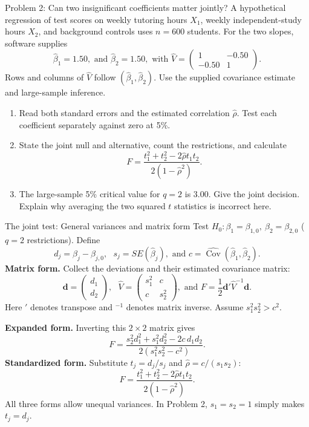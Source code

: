 \documentclass[notes,10pt, aspectratio=169]{beamer}
\newcommand{\Cov}{\operatorname{Cov}}
\begin{document}
\begin{frame}{Problem 2: Can two insignificant coefficients matter jointly?}
\small
A hypothetical regression of test scores on weekly tutoring hours $X_1$, weekly independent-study hours $X_2$, and background controls uses $n=600$ students. For the two slopes, software supplies
\[
\hat\beta_1=1.50,\text{ and }\hat\beta_2=1.50,\text{ with }
\widehat V=\begin{pmatrix}1&-0.50\\-0.50&1\end{pmatrix}.
\]
Rows and columns of $\widehat V$ follow $(\hat\beta_1,\hat\beta_2)$. Use the supplied covariance estimate and large-sample inference.
\begin{enumerate}
\item Read both standard errors and the estimated correlation $\hat\rho$. Test each coefficient separately against zero at 5\%.
\item State the joint null and alternative, count the restrictions, and calculate
\[
F=\frac{t_1^2+t_2^2-2\hat\rho t_1t_2}{2(1-\hat\rho^2)}.
\]
\item The large-sample 5\% critical value for $q=2$ is $3.00$. Give the joint decision. Explain why averaging the two squared $t$ statistics is incorrect here.
\end{enumerate}
\end{frame}

\begin{frame}{The joint test: General variances and matrix form}
\footnotesize
\setlength{\abovedisplayskip}{3pt}
\setlength{\belowdisplayskip}{3pt}
Test $H_0:\beta_1=\beta_{1,0},\ \beta_2=\beta_{2,0}$ ($q=2$ restrictions). Define
\[
d_j=\hat\beta_j-\beta_{j,0},\text{ }s_j=SE(\hat\beta_j),
\text{ and }c=\widehat{\Cov}(\hat\beta_1,\hat\beta_2).
\]
\textbf{Matrix form.} Collect the deviations and their estimated covariance matrix:
\[
\boldsymbol d=\begin{pmatrix}d_1\\d_2\end{pmatrix},
\text{ }\widehat V=\begin{pmatrix}s_1^2&c\\c&s_2^2\end{pmatrix},
\text{ and }\boxed{F=\frac{1}{2}\boldsymbol d'\widehat V^{-1}\boldsymbol d}.
\]
Here $'$ denotes transpose and $^{-1}$ denotes matrix inverse. Assume $s_1^2s_2^2>c^2$.
\par\smallskip
\textbf{Expanded form.} Inverting this $2\times2$ matrix gives
\[
\boxed{F=\frac{s_2^2d_1^2+s_1^2d_2^2-2c\,d_1d_2}{2(s_1^2s_2^2-c^2)}}.
\]
\textbf{Standardized form.} Substitute $t_j=d_j/s_j$ and $\hat\rho=c/(s_1s_2)$:
\[
F=\frac{t_1^2+t_2^2-2\hat\rho t_1t_2}{2(1-\hat\rho^2)}.
\]
All three forms allow unequal variances. In Problem 2, $s_1=s_2=1$ simply makes $t_j=d_j$.
\end{frame}
\end{document}
